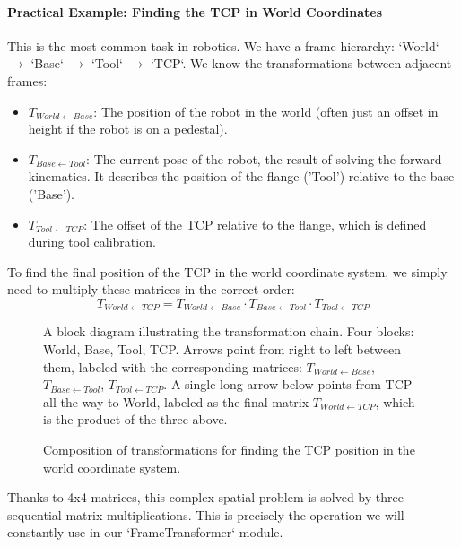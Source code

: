 \paragraph{Practical Example: Finding the TCP in World Coordinates}
This is the most common task in robotics. We have a frame hierarchy: `World` $\rightarrow$ `Base` $\rightarrow$ `Tool` $\rightarrow$ `TCP`. We know the transformations between adjacent frames:
\begin{itemize}
    \item $T_{World \leftarrow Base}$: The position of the robot in the world (often just an offset in height if the robot is on a pedestal).
    \item $T_{Base \leftarrow Tool}$: The current pose of the robot, the result of solving the forward kinematics. It describes the position of the flange ('Tool') relative to the base ('Base').
    \item $T_{Tool \leftarrow TCP}$: The offset of the TCP relative to the flange, which is defined during tool calibration.
\end{itemize}
To find the final position of the TCP in the world coordinate system, we simply need to multiply these matrices in the correct order:
$$ T_{World \leftarrow TCP} = T_{World \leftarrow Base} \cdot T_{Base \leftarrow Tool} \cdot T_{Tool \leftarrow TCP} $$

\begin{figure}[h!]
    \centering
    \begin{tcolorbox}[width=\textwidth, halign=center, title=Composition of Transformations to Find TCP Pose]
        A block diagram illustrating the transformation chain. Four blocks: World, Base, Tool, TCP. Arrows point from right to left between them, labeled with the corresponding matrices: $T_{World \leftarrow Base}$, $T_{Base \leftarrow Tool}$, $T_{Tool \leftarrow TCP}$. A single long arrow below points from TCP all the way to World, labeled as the final matrix $T_{World \leftarrow TCP}$, which is the product of the three above.
    \end{tcolorbox}
    \caption{Composition of transformations for finding the TCP position in the world coordinate system.}
    \label{fig:tcp_composition}
\end{figure}

Thanks to 4x4 matrices, this complex spatial problem is solved by three sequential matrix multiplications. This is precisely the operation we will constantly use in our `FrameTransformer` module.

